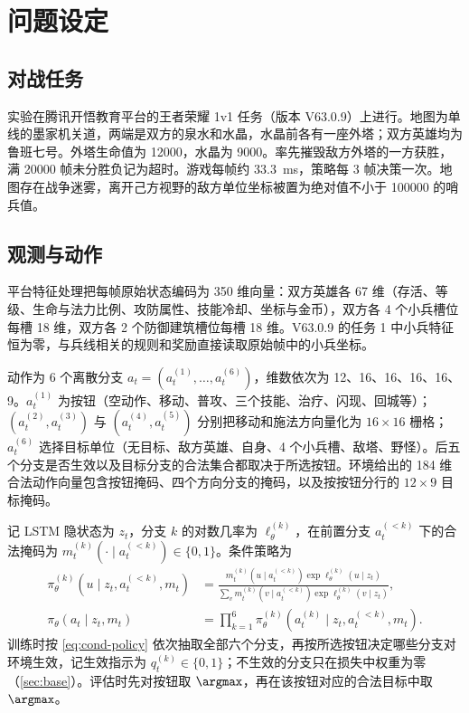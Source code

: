 \section{问题设定}
\label{sec:problem}

\subsection{对战任务}
\label{sec:task}

实验在腾讯开悟教育平台的王者荣耀 1v1 任务（版本 V63.0.9）上进行\cite{kaiwu63}。地图为单线的墨家机关道，两端是双方的泉水和水晶，水晶前各有一座外塔；双方英雄均为鲁班七号。外塔生命值为 \num{12000}，水晶为 \num{9000}。率先摧毁敌方外塔的一方获胜，满 \num{20000} 帧未分胜负记为超时。游戏每帧约 \qty{33.3}{\milli\second}，策略每 \num{3} 帧决策一次。地图存在战争迷雾，离开己方视野的敌方单位坐标被置为绝对值不小于 \num{100000} 的哨兵值。

\subsection{观测与动作}
\label{sec:obs-action}

平台特征处理把每帧原始状态编码为 \num{350} 维向量：双方英雄各 \num{67} 维（存活、等级、生命与法力比例、攻防属性、技能冷却、坐标与金币），双方各 \num{4} 个小兵槽位每槽 \num{18} 维，双方各 \num{2} 个防御建筑槽位每槽 \num{18} 维。V63.0.9 的任务 1 中小兵特征恒为零，与兵线相关的规则和奖励直接读取原始帧中的小兵坐标。

动作为 \num{6} 个离散分支 $a_t=(a_t^{(1)},\dots,a_t^{(6)})$，维数依次为 \num{12}、\num{16}、\num{16}、\num{16}、\num{16}、\num{9}。$a_t^{(1)}$ 为按钮（空动作、移动、普攻、三个技能、治疗、闪现、回城等）；$(a_t^{(2)},a_t^{(3)})$ 与 $(a_t^{(4)},a_t^{(5)})$ 分别把移动和施法方向量化为 $16\times16$ 栅格；$a_t^{(6)}$ 选择目标单位（无目标、敌方英雄、自身、\num{4} 个小兵槽、敌塔、野怪）。后五个分支是否生效以及目标分支的合法集合都取决于所选按钮。环境给出的 \num{184} 维合法动作向量包含按钮掩码、四个方向分支的掩码，以及按按钮分行的 $12\times9$ 目标掩码。

记 LSTM 隐状态为 $z_t$，分支 $k$ 的对数几率为 $\ell_\theta^{(k)}$，在前置分支 $a_t^{(<k)}$ 下的合法掩码为 $m_t^{(k)}(\cdot\mid a_t^{(<k)})\in\{0,1\}$。条件策略为
\begin{align}
  \pi_\theta^{(k)}(u\mid z_t,a_t^{(<k)},m_t)
  &=\frac{m_t^{(k)}(u\mid a_t^{(<k)})\exp\ell_\theta^{(k)}(u\mid z_t)}
         {\sum_{v}m_t^{(k)}(v\mid a_t^{(<k)})\exp\ell_\theta^{(k)}(v\mid z_t)},
  \label{eq:cond-policy-branch}\\
  \pi_\theta(a_t\mid z_t,m_t)
  &=\prod_{k=1}^{6}\pi_\theta^{(k)}(a_t^{(k)}\mid z_t,a_t^{(<k)},m_t).
  \label{eq:cond-policy}
\end{align}
训练时按 \cref{eq:cond-policy} 依次抽取全部六个分支，再按所选按钮决定哪些分支对环境生效，记生效指示为 $q_t^{(k)}\in\{0,1\}$；不生效的分支只在损失中权重为零（\cref{sec:base}）。评估时先对按钮取 $\argmax$，再在该按钮对应的合法目标中取 $\argmax$。


